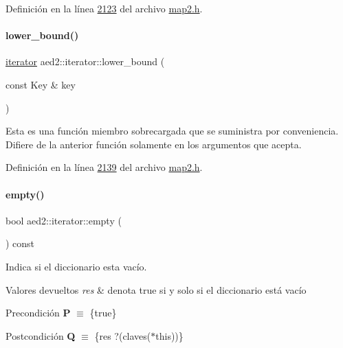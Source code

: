 Definición en la línea \hyperlink{map2_8h_source_l02123}{2123} del archivo \hyperlink{map2_8h_source}{map2.\+h}.

\mbox{\label{classaed2_1_1iterator_ac48bbb54fea69c1fb4c093eecda02c5a_ac48bbb54fea69c1fb4c093eecda02c5a}} 
\paragraph{\texorpdfstring{lower\+\_\+bound()}{lower\_bound()}\hspace{0.1cm}{\footnotesize\ttfamily [2/2]}}
{\footnotesize\ttfamily \hyperlink{classaed2_1_1iterator_1_1iterator}{iterator} aed2\+::iterator\+::lower\+\_\+bound (\begin{DoxyParamCaption}\item[{const Key \&}]{key }\end{DoxyParamCaption})\hspace{0.3cm}{\ttfamily [inline]}}

Esta es una función miembro sobrecargada que se suministra por conveniencia. Difiere de la anterior función solamente en los argumentos que acepta. 

Definición en la línea \hyperlink{map2_8h_source_l02139}{2139} del archivo \hyperlink{map2_8h_source}{map2.\+h}.

\mbox{\label{classaed2_1_1iterator_a7f98e1c0896c0d960a9dc020a0a4edb8_a7f98e1c0896c0d960a9dc020a0a4edb8}} 
\paragraph{\texorpdfstring{empty()}{empty()}}
{\footnotesize\ttfamily bool aed2\+::iterator\+::empty (\begin{DoxyParamCaption}{ }\end{DoxyParamCaption}) const\hspace{0.3cm}{\ttfamily [inline]}}



Indica si el diccionario esta vacío. 


\begin{DoxyRetVals}{Valores devueltos}
{\em res} & denota true si y solo si el diccionario está vacío\\
\hline
\end{DoxyRetVals}
\begin{DoxyPrecond}{Precondición}
{\bfseries P} $\equiv$ \{true\} 
\end{DoxyPrecond}
\begin{DoxyPostcond}{Postcondición}
{\bfseries Q} $\equiv$ \{res   ?(claves($\ast$this))\}
\end{DoxyPostcond}

